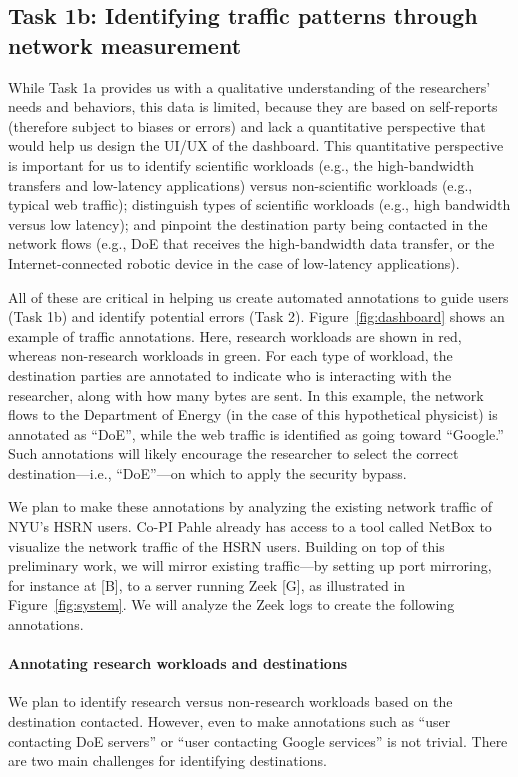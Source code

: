\subsection{Task 1b: Identifying traffic patterns through network measurement}

While Task 1a provides us with a qualitative understanding of the researchers' needs and behaviors, this data is limited, because they are based on self-reports (therefore subject to biases or errors) and lack a quantitative perspective that would help us design the UI/UX of the dashboard.
This quantitative perspective is important for us to identify scientific workloads (e.g., the high-bandwidth transfers and low-latency applications) versus non-scientific workloads (e.g., typical web traffic); distinguish types of scientific workloads (e.g., high bandwidth versus low latency); and pinpoint the destination party being contacted in the network flows (e.g., DoE that receives the high-bandwidth data transfer, or the Internet-connected robotic device in the case of low-latency applications).

All of these are critical in helping us create automated annotations to guide users (Task 1b) and identify potential errors (Task 2). Figure~\ref{fig:dashboard} shows an example of traffic annotations. Here, research workloads are shown in red, whereas non-research workloads in green. For each type of workload, the destination parties are annotated to indicate who is interacting with the researcher, along with how many bytes are sent. In this example, the network flows to the Department of Energy (in the case of this hypothetical physicist) is annotated as ``DoE'', while the web traffic is identified as going toward ``Google.'' Such annotations will likely encourage the researcher to select the correct destination---i.e., ``DoE''---on which to apply the security bypass.

We plan to make these annotations by analyzing the existing network traffic of NYU's HSRN users. Co-PI Pahle already has access to a tool called NetBox to visualize the network traffic of the HSRN users. Building on top of this preliminary work, we will mirror existing traffic---by setting up port mirroring, for instance at [B], to a server running Zeek [G], as illustrated in Figure~\ref{fig:system}. We will analyze the Zeek logs to create the following annotations.

\paragraph{Annotating research workloads and destinations}
We plan to identify research versus non-research workloads based on the destination contacted. However, even to make annotations such as ``user contacting DoE servers'' or ``user contacting Google services'' is not trivial. There are two main challenges for identifying  destinations.

